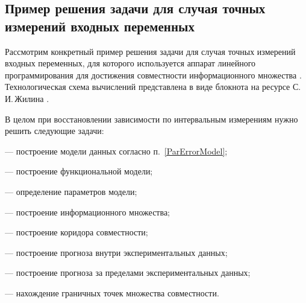 \documentclass[a5paper,openany]{book}
\newcounter{Examp}
\begin{document}
\subsection{Пример решения задачи для случая точных измерений входных переменных} \label{ExactInputSectExample}


Рассмотрим конкретный пример решения задачи для случая точных измерений входных переменных,
для которого используется аппарат линейного программирования для достижения совместности информационного множества \cite{Zhilin2005, Zhilin2007}. 
Технологическая схема вычислений представлена в виде блокнота на ресурсе С.\,И.\,Жилина \cite{IntervalAnalysisExamples}.

В целом при восстановлении зависимости по интервальным измерениям нужно решить следующие задачи:
\begin{list}{}{\leftmargin=10mm\itemsep=5pt\topsep=3pt\parsep=0pt} 
	\item [---] построение модели данных согласно п.~\ref{ParErrorModel};
	\item [---] построение функциональной модели;
	\item [---] определение параметров модели;
	\item [---] построение информационного множества;
	\item [---] построение коридора совместности;	
	\item [---] построение прогноза внутри экспериментальных данных;
	\item [---] построение прогноза за пределами экспериментальных данных;
	\item [---] нахождение граничных точек множества совместности.
\end{list}
\end{document}
